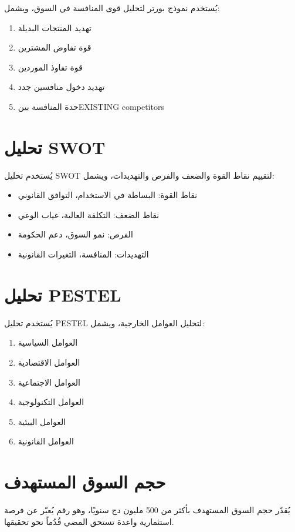\documentclass[12pt, a4paper, twoside]{report}
\begin{document}
يُستخدم نموذج بورتر لتحليل قوى المنافسة في السوق، ويشمل:
\begin{enumerate}
    \item تهديد المنتجات البديلة
    \item قوة تفاوض المشترين
    \item قوة تفاوذ الموردين
    \item تهديد دخول منافسين جدد
    \item حدة المنافسة بينEXISTING competitors
\end{enumerate}

\section{تحليل SWOT}

يُستخدم تحليل SWOT لتقييم نقاط القوة والضعف والفرص والتهديدات، ويشمل:
\begin{itemize}
    \item نقاط القوة: البساطة في الاستخدام، التوافق القانوني
    \item نقاط الضعف: التكلفة العالية، غياب الوعي
    \item الفرص: نمو السوق، دعم الحكومة
    \item التهديدات: المنافسة، التغيرات القانونية
\end{itemize}

\section{تحليل PESTEL}

يُستخدم تحليل PESTEL لتحليل العوامل الخارجية، ويشمل:
\begin{enumerate}
    \item العوامل السياسية
    \item العوامل الاقتصادية
    \item العوامل الاجتماعية
    \item العوامل التكنولوجية
    \item العوامل البيئية
    \item العوامل القانونية
\end{enumerate}

\section{حجم السوق المستهدف}

يُقدّر حجم السوق المستهدف بأكثر من 500 مليون دج سنويًا، وهو رقم يُعبّر عن فرصة استثمارية واعدة تستحق المضي قُدُماً نحو تحقيقها.
\end{document}
